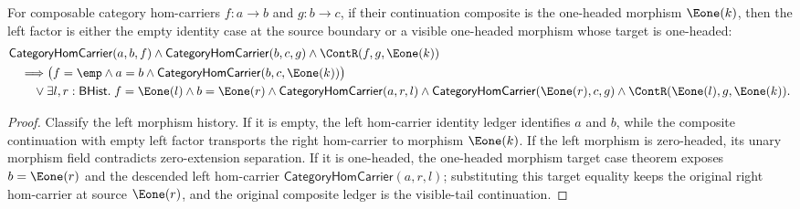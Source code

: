 \begin{theorem}
\label{thm:category-hom-carrier-comp-e1-morphism-left-factor-cases}
For composable category hom-carriers $f:a\to b$ and $g:b\to c$, if their
continuation composite is the one-headed morphism $\Eone(k)$, then the left
factor is either the empty identity case at the source boundary or a visible
one-headed morphism whose target is one-headed:
$$
\begin{aligned}
&\mathsf{CategoryHomCarrier}(a,b,f)\land
\mathsf{CategoryHomCarrier}(b,c,g)\land
\ContR(f,g,\Eone(k))\\
&\quad\Longrightarrow
\bigl(f=\emp\land a=b\land
\mathsf{CategoryHomCarrier}(b,c,\Eone(k))\bigr)\\
&\qquad\lor
\exists l,r:\mathsf{BHist}.\;
f=\Eone(l)\land b=\Eone(r)\land
\mathsf{CategoryHomCarrier}(a,r,l)\land
\mathsf{CategoryHomCarrier}(\Eone(r),c,g)\land
\ContR(\Eone(l),g,\Eone(k)).
\end{aligned}
$$
\end{theorem}
\begin{proof}
Classify the left morphism history. If it is empty, the left hom-carrier
identity ledger identifies $a$ and $b$, while the composite continuation with
empty left factor transports the right hom-carrier to morphism $\Eone(k)$. If
the left morphism is zero-headed, its unary morphism field contradicts
zero-extension separation. If it is one-headed, the one-headed morphism target
case theorem exposes $b=\Eone(r)$ and the descended left hom-carrier
$\mathsf{CategoryHomCarrier}(a,r,l)$; substituting this target equality keeps
the original right hom-carrier at source $\Eone(r)$, and the original composite
ledger is the visible-tail continuation.
\end{proof}

